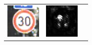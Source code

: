 \begin{table}
	\centering
	\begin{tabular}{p{4.5cm}p{4.5cm}p{4.5cm}}
		\includegraphics[width=\linewidth]{Images/AnPe/5_1_Links} & \includegraphics[width=\linewidth]{Images/AnPe/5_1_Mitte} &

\end{tabular}
\end{table}
